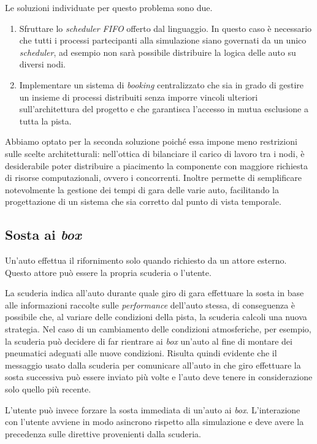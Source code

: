 Le soluzioni individuate per questo problema sono due.
\begin{enumerate}
\item Sfruttare lo \textit{scheduler FIFO} offerto dal linguaggio. In questo caso è necessario che tutti i processi partecipanti alla simulazione siano governati da un unico \textit{scheduler}, ad esempio non sarà possibile distribuire la logica delle auto su diversi nodi.
\item Implementare un sistema di \textit{booking} centralizzato che sia in grado di gestire un insieme di processi distribuiti senza imporre vincoli ulteriori sull'architettura del progetto e che garantisca l'accesso in mutua esclusione a tutta la pista.
\end{enumerate}
Abbiamo optato per la seconda soluzione poiché essa impone meno restrizioni sulle scelte architetturali: nell'ottica di bilanciare il carico di lavoro tra i nodi, è desiderabile poter distribuire a piacimento la componente con maggiore richiesta di risorse computazionali, ovvero i concorrenti. Inoltre permette di semplificare notevolmente la gestione dei tempi di gara delle varie auto, facilitando la progettazione di un sistema che sia corretto dal punto di vista temporale.

\subsection*{Sosta ai \textit{box}}
Un'auto effettua il rifornimento solo quando richiesto da un attore esterno. Questo attore può essere la propria scuderia o l'utente.

La scuderia indica all'auto durante quale giro di gara effettuare la sosta in base alle informazioni raccolte sulle \textit{performance} dell'auto stessa, di conseguenza è possibile che, al variare delle condizioni della pista, la scuderia calcoli una nuova strategia. Nel caso di un cambiamento delle condizioni atmosferiche, per esempio, la scuderia può decidere di far rientrare ai \textit{box} un'auto al fine di montare dei pneumatici adeguati alle nuove condizioni. Risulta quindi evidente che il messaggio usato dalla scuderia per comunicare all'auto in che giro effettuare la sosta successiva può essere inviato più volte e l'auto deve tenere in considerazione solo quello più recente.

L'utente può invece forzare la sosta immediata di un'auto ai \textit{box}. L'interazione con l'utente avviene in modo asincrono rispetto alla simulazione e deve avere la precedenza sulle direttive provenienti dalla scuderia.

